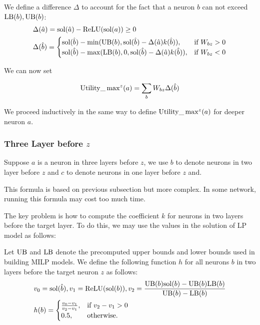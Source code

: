 We define a difference $\Delta$ to account for the fact that a neuron $b$ 
can not exceed $\mathrm{LB}(b),\mathrm{UB}(b)$:
	\begin{align*}
		&\Delta(\hat{a}) = \mathrm{sol}(\hat{a}) - \mathrm{ReLU}(\mathrm{sol}(a)) \geq 0\\
			&\Delta(\hat{b}) =
		\begin{cases}
			\mathrm{sol}(\hat{b}) - \min(\mathrm{UB}(b), \mathrm{sol}(\hat{b}) - \Delta(\hat{a}) k(\hat{b})), & \text{if }  W_{bz} > 0 \\
			\mathrm{sol}(\hat{b}) - \max(\mathrm{LB}(b), 0, \mathrm{sol}(\hat{b}) -\Delta(\hat{a}) k(\hat{b})), & \text{if }W_{bz} < 0\\
		\end{cases}
		\end{align*}

We can now set 

$$ \mathrm{Utility}\_\max\nolimits^z(a) = \sum_b W_{bz} \Delta(\hat{b})$$
 
We proceed inductively in the same way to define $\mathrm{Utility}\_\max^z(a)$ for deeper neuron $a$.

\iffalse
\subsubsection*{Three Layer before  $z$} 

Suppose $a$ is a neuron in three layers before $z$, we use $b$ to denote neurons in two layer before $z$ and $c$ to denote neurons in one layer before $z$ and. 

This formula is based on previous subsection but more complex. In some network, running this formula may cost too much time. 

The key problem is how to compute the coefficient $k$ for neurons in two layers before the target layer. To do this, we may use the values in the solution of LP model as follows:

\begin{definition}\label{3layer}
Let $\mathrm{UB}$ and $\mathrm{LB}$ denote the precomputed upper bounds and lower bounds used in building MILP models. We define the following function $h$ for all neurons $b$ in two layers before the target neuron $z$ as follows:
	\begin{align}
		&v_0 = \mathrm{sol}(\hat{b}), v_1 = \mathrm{ReLU}(\mathrm{sol}(b)), v_2 = \frac{\mathrm{UB}(b)\mathrm{sol}(b)-\mathrm{UB}(b)\mathrm{LB}(b)}{\mathrm{UB}(b)-\mathrm{LB}(b)}\\
		&h(b) =
		\begin{cases}
			\frac{v_0-v_1}{v_2-v_1}, & \text{if } v_2-v_1 > 0\\
			0.5, & \text{otherwise.}
		\end{cases}
	\end{align} 
\end{definition} 

